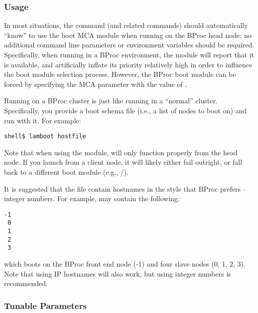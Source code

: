 
\subsubsection{Usage}

In most situations, the  command (and related commands)
should automatically ``know'' to use the  boot MCA module
when running on the BProc head node; no additional command line
parameters or environment variables should be required.  
%
Specifically, when running in a BProc environment, the 
module will report that it is available, and artificially inflate its
priority relatively high in order to influence the boot module
selection process.
%
However, the BProc boot module can be forced by specifying the
 MCA parameter with the value of
.

Running  on a BProc cluster is just like running
 in a ``normal'' cluster.  Specifically, you provide a
boot schema file (i.e., a list of nodes to boot on) and run
 with it.  For example:

\lstset{style=lam-cmdline}
\begin{lstlisting}
shell$ lamboot hostfile
\end{lstlisting}

Note that when using the  module,  will only
function properly from the head node.  If you launch 
from a client node, it will likely either fail outright, or fall back
to a different boot module (e.g., /).

It is suggested that the  file contain hostnames in the
style that BProc prefers -- integer numbers.  For example,
 may contain the following:

\lstset{style=lam-shell}
\begin{lstlisting}
-1
 0
 1
 2
 3
\end{lstlisting}

\noindent which boots on the BProc front end node (-1) and four slave
nodes (0, 1, 2, 3).  Note that using IP hostnames will also work, but
using integer numbers is recommended.


\subsubsection{Tunable Parameters}

